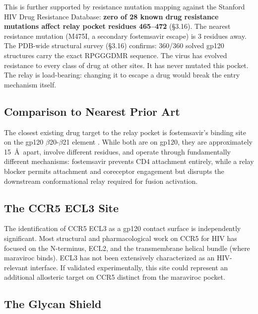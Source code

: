 \documentclass[11pt,a4paper]{article}
\begin{document}
This is further supported by resistance mutation mapping against the Stanford HIV Drug Resistance Database: \textbf{zero of 28 known drug resistance mutations affect relay pocket residues 465--472} (\S3.16). The nearest resistance mutation (M475I, a secondary fostemsavir escape) is 3 residues away. The PDB-wide structural survey (\S3.16) confirms: 360/360 solved gp120 structures carry the exact RPGGGDMR sequence. The virus has evolved resistance to every class of drug at other sites. It has never mutated this pocket. The relay is load-bearing: changing it to escape a drug would break the entry mechanism itself.

\subsection{Comparison to Nearest Prior Art}

The closest existing drug target to the relay pocket is fostemsavir's binding site on the gp120 $\beta$20-$\beta$21 element \citep{Pancera2017}. While both are on gp120, they are approximately 15~\AA\ apart, involve different residues, and operate through fundamentally different mechanisms: fostemsavir prevents CD4 attachment entirely, while a relay blocker permits attachment and coreceptor engagement but disrupts the downstream conformational relay required for fusion activation.

\subsection{The CCR5 ECL3 Site}

The identification of CCR5 ECL3 as a gp120 contact surface is independently significant. Most structural and pharmacological work on CCR5 for HIV has focused on the N-terminus, ECL2, and the transmembrane helical bundle (where maraviroc binds). ECL3 has not been extensively characterized as an HIV-relevant interface. If validated experimentally, this site could represent an additional allosteric target on CCR5 distinct from the maraviroc pocket.

\subsection{The Glycan Shield}
\end{document}
